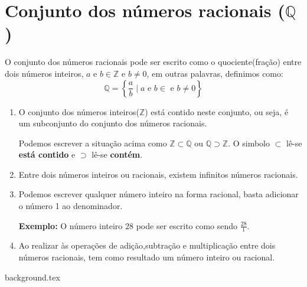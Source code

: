 \documentclass[10pt]{article}
\begin{document}
\section*{Conjunto dos números racionais (\( \mathbb{Q} \))}
O conjunto dos números racionais pode ser escrito como o quociente(fração) entre dois números inteiros, \( a \) e \(  b \in \mathbb{Z} \) e \( b \neq 0 \), em outras palavras, definimos como:
\[ \mathbb{Q} = \left\{ \frac{a}{b} \mid  a \textrm{ e } b \in \textrm{ e } b \neq 0 \right\} \]

\begin{enumerate}[label=\textbf{(\Roman*)}]
        \item O conjunto dos números inteiros(\(\mathbb{Z}\)) está contido neste conjunto, ou seja, é um subconjunto do conjunto dos números racionais.
        \begin{obs}
        Podemos escrever a situação acima como \( \mathbb{Z} \subset \mathbb{Q} \) ou \( \mathbb{Q} \supset \mathbb{Z} \). O simbolo \( \subset \) lê-se \textbf{está contido} e \( \supset \) lê-se \textbf{contém}.
        \end{obs}
        \item Entre dois números inteiros ou racionais, existem infinitos números racionais.
        \item Podemos escrever qualquer número inteiro na forma racional, basta adicionar o número 1 ao denominador.
        
        \textbf{Exemplo:} O número inteiro \( 28 \) pode ser escrito como sendo \( \frac{28}{1} \).
        \item  Ao realizar às operações de adição,subtração e multiplicação entre dois números racionais, tem como resultado um número inteiro ou racional.
\end{enumerate}
\newpage
{background.tex} %
\end{document}
